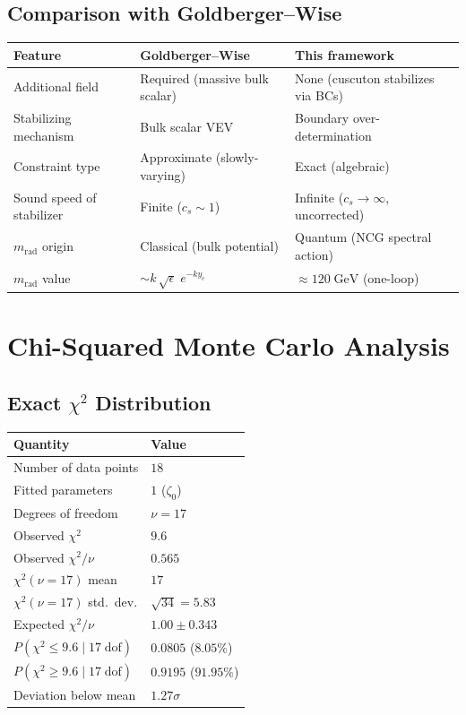 \subsection{Comparison with Goldberger--Wise}

\begin{center}
\begin{tabular}{l l l}
\hline
Feature & Goldberger--Wise & This framework \\
\hline
Additional field & Required (massive bulk scalar) & None (cuscuton stabilizes via BCs) \\
Stabilizing mechanism & Bulk scalar VEV & Boundary over-determination \\
Constraint type & Approximate (slowly-varying) & Exact (algebraic) \\
Sound speed of stabilizer & Finite ($c_s \sim 1$) & Infinite ($c_s \to \infty$, uncorrected) \\
$m_{\mathrm{rad}}$ origin & Classical (bulk potential) & Quantum (NCG spectral action) \\
$m_{\mathrm{rad}}$ value & $\sim k\,\sqrt{\epsilon}\;e^{-ky_c}$ & $\approx 120\;\mathrm{GeV}$ (one-loop) \\
\hline
\end{tabular}
\end{center}


\section{Chi-Squared Monte Carlo Analysis}
\label{app:chi2}

\subsection{Exact $\chi^2$ Distribution}

\begin{center}
\begin{tabular}{l l}
\hline
Quantity & Value \\
\hline
Number of data points & $18$ \\
Fitted parameters & $1$ ($\zeta_0$) \\
Degrees of freedom & $\nu = 17$ \\
Observed $\chi^2$ & $9.6$ \\
Observed $\chi^2/\nu$ & $0.565$ \\
\hline
$\chi^2(\nu = 17)$ mean & $17$ \\
$\chi^2(\nu = 17)$ std.\ dev. & $\sqrt{34} = 5.83$ \\
Expected $\chi^2/\nu$ & $1.00 \pm 0.343$ \\
\hline
$P(\chi^2 \leq 9.6 \mid 17\;\mathrm{dof})$ & $0.0805$ ($8.05\%$) \\
$P(\chi^2 \geq 9.6 \mid 17\;\mathrm{dof})$ & $0.9195$ ($91.95\%$) \\
Deviation below mean & $1.27\sigma$ \\
\hline
\end{tabular}
\end{center}

